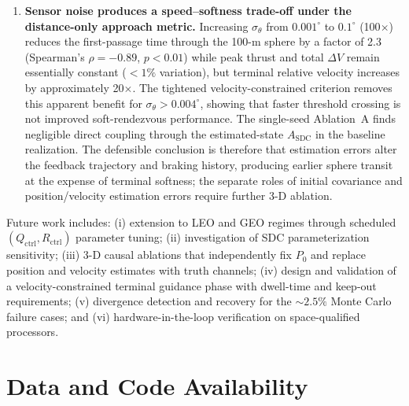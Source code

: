 \documentclass[preprint,3p,times]{elsarticle}
\begin{document}
\begin{enumerate}
    \item \textbf{Sensor noise produces a speed--softness trade-off under the distance-only approach metric.} Increasing $\sigma_\theta$ from $0.001^\circ$ to $0.1^\circ$ (100$\times$) reduces the first-passage time through the 100-m sphere by a factor of 2.3 (Spearman's $\rho = -0.89$, $p < 0.01$) while peak thrust and total $\Delta V$ remain essentially constant (${<}1\%$ variation), but terminal relative velocity increases by approximately 20$\times$. The tightened velocity-constrained criterion removes this apparent benefit for $\sigma_\theta > 0.004^\circ$, showing that faster threshold crossing is not improved soft-rendezvous performance. The single-seed Ablation~A finds negligible direct coupling through the estimated-state $A_{\text{SDC}}$ in the baseline realization. The defensible conclusion is therefore that estimation errors alter the feedback trajectory and braking history, producing earlier sphere transit at the expense of terminal softness; the separate roles of initial covariance and position/velocity estimation errors require further 3-D ablation.
\end{enumerate}

Future work includes: (i) extension to LEO and GEO regimes through scheduled $(Q_{\text{ctrl}}, R_{\text{ctrl}})$ parameter tuning; (ii) investigation of SDC parameterization sensitivity; (iii) 3-D causal ablations that independently fix $P_0$ and replace position and velocity estimates with truth channels; (iv) design and validation of a velocity-constrained terminal guidance phase with dwell-time and keep-out requirements; (v) divergence detection and recovery for the ${\sim}2.5\%$ Monte Carlo failure cases; and (vi) hardware-in-the-loop verification on space-qualified processors.

\section*{Data and Code Availability}
\end{document}
